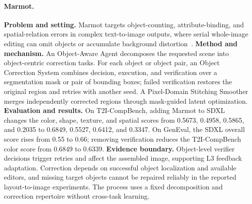 \paragraph{Marmot.}
\textbf{Problem and setting.} Marmot targets object-counting, attribute-binding, and spatial-relation errors in complex text-to-image outputs, where serial whole-image editing can omit objects or accumulate background distortion~\cite{sun2025marmot}. \textbf{Method and mechanism.} An Object-Aware Agent decomposes the requested scene into object-centric correction tasks. For each object or object pair, an Object Correction System combines decision, execution, and verification over a segmentation mask or pair of bounding boxes; failed verification restores the original region and retries with another seed. A Pixel-Domain Stitching Smoother merges independently corrected regions through mask-guided latent optimization. \textbf{Evaluation and results.} On T2I-CompBench, adding Marmot to SDXL changes the color, shape, texture, and spatial scores from 0.5673, 0.4958, 0.5865, and 0.2035 to 0.6849, 0.5527, 0.6412, and 0.3347. On GenEval, the SDXL overall score rises from 0.55 to 0.66; removing verification reduces the T2I-CompBench color score from 0.6849 to 0.6339. \textbf{Evidence boundary.} Object-level verifier decisions trigger retries and affect the assembled image, supporting L3 feedback adaptation. Correction depends on successful object localization and available editors, and missing target objects cannot be repaired reliably in the reported layout-to-image experiments. The process uses a fixed decomposition and correction repertoire without cross-task learning.

